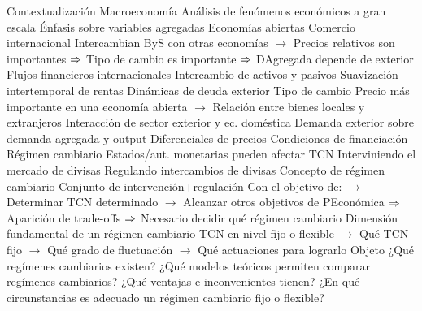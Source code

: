 \documentclass{nuevotema}
\begin{document}
\begin{esquemal}
	\1[] 
		\2 Contextualización
			\3 Macroeconomía
				\4 Análisis de fenómenos económicos a gran escala
				\4 Énfasis sobre variables agregadas
			\3 Economías abiertas
				\4 Comercio internacional
				\4[] Intercambian ByS con otras economías
				\4[] $\to$ Precios relativos son importantes
				\4[] $\Rightarrow$ Tipo de cambio es importante
				\4[] $\Rightarrow$ DAgregada depende de exterior
				\4 Flujos financieros internacionales
				\4[] Intercambio de activos y pasivos
				\4[] Suavización intertemporal de rentas
				\4[] Dinámicas de deuda exterior
				\4 Tipo de cambio
				\4[] Precio más importante en una economía abierta
				\4[] $\to$ Relación entre bienes locales y extranjeros
				\4 Interacción de sector exterior y ec. doméstica
				\4[] Demanda exterior sobre demanda agregada y output
				\4[] Diferenciales de precios
				\4[] Condiciones de financiación
			\3 Régimen cambiario
				\4 Estados/aut. monetarias pueden afectar TCN
				\4[] Interviniendo el mercado de divisas
				\4[] Regulando intercambios de divisas
				\4 Concepto de régimen cambiario
				\4[] Conjunto de intervención+regulación
				\4[] Con el objetivo de:
				\4[] $\to$ Determinar TCN determinado
				\4[] $\to$ Alcanzar otros objetivos de PEconómica
				\4[] $\Rightarrow$ Aparición de trade-offs
				\4[] $\Rightarrow$ Necesario decidir qué régimen cambiario
				\4 Dimensión fundamental de un régimen cambiario
				\4[] TCN en nivel fijo o flexible
				\4[] $\to$ Qué TCN fijo
				\4[] $\to$ Qué grado de fluctuación
				\4[] $\to$ Qué actuaciones para lograrlo
		\2 Objeto
			\3 ¿Qué regímenes cambiarios existen?
			\3 ¿Qué modelos teóricos permiten comparar regímenes cambiarios?
			\3 ¿Qué ventajas e inconvenientes tienen?
			\3 ¿En qué circunstancias es adecuado un régimen cambiario fijo o flexible?

\end{esquemal}
\end{document}
